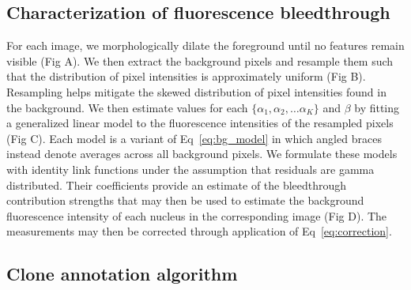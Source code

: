 \documentclass[10pt,letterpaper]{article}
\begin{document}
\subsection*{Characterization of fluorescence bleedthrough}

For each image, we morphologically dilate the foreground until no features remain visible (Fig A). We then extract the background pixels and resample them such that the distribution of pixel intensities is approximately uniform (Fig B). Resampling helps mitigate the skewed distribution of pixel intensities found in the background. We then estimate values for each $\{\alpha_1, \alpha_2, \ldots \alpha_K\}$ and $\beta$ by fitting a generalized linear model to the fluorescence intensities of the resampled pixels (Fig C). Each model is a variant of Eq~\ref{eq:bg_model} in which angled braces instead denote averages across all background pixels. We formulate these models with identity link functions under the assumption that residuals are gamma distributed. Their coefficients provide an estimate of the bleedthrough contribution strengths that may then be used to estimate the background fluorescence intensity of each nucleus in the corresponding image (Fig D). The measurements may then be corrected through application of Eq~\ref{eq:correction}. 

\subsection*{Clone annotation algorithm} 
\end{document}
